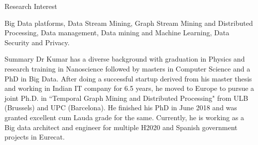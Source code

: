 \documentclass{resume} %
\begin{document}
\begin{rSection}{Research Interest}

Big Data platforms, Data Stream Mining, Graph Stream Mining and Distributed Processing, Data management, Data mining and Machine Learning, Data Security and Privacy.

\end{rSection}
\begin{rSection}{Summary}
Dr Kumar has a diverse background with graduation in Physics and research training in Nanoscience followed by masters in Computer Science and a PhD in Big Data. After doing a successful startup derived from his master thesis and working in Indian IT company for 6.5 years, he moved to Europe to pursue a joint Ph.D. in ``Temporal Graph Mining and Distributed Processing" from ULB (Brussels) and UPC (Barcelona). He finished his PhD in June 2018 and was granted excellent cum Lauda grade for the same. Currently, he is working as a Big data architect and engineer for multiple H2020 and Spanish government projects in Eurecat.
\end{rSection}



\end{document}
